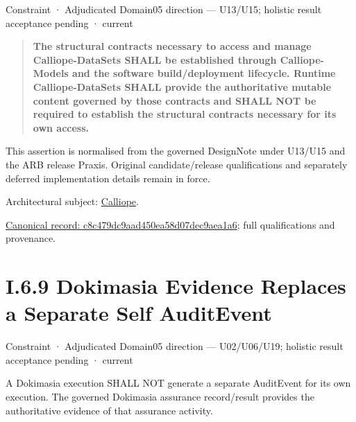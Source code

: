 \label{element:c8c479dc9aad450ea58d07dec9aea1a6}
{\small Constraint · Adjudicated Domain05 direction — U13/U15; holistic result acceptance pending · current}\par

\begin{quote}


\textbf{The structural contracts necessary to access and manage
Calliope-DataSets SHALL be established through Calliope-Models and the
software build/deployment lifecycle. Runtime Calliope-DataSets SHALL
provide the authoritative mutable content governed by those contracts
and SHALL NOT be required to establish the structural contracts
necessary for its own access.}



\end{quote}


This assertion is normalised from the governed DesignNote under U13/U15 and the ARB release Praxis. Original candidate/release qualifications and separately deferred implementation details remain in force.



Architectural subject: \hyperref[element:466ad8f75a954c0581b5bba090443849]{Calliope}.


{\footnotesize \href{../../../../continuum/motivation/constraint/c8c479dc9aad450ea58d07dec9aea1a6.md}{Canonical record: c8c479dc9aad450ea58d07dec9aea1a6}; full qualifications and provenance.}\par
\section*{I.6.9 Dokimasia Evidence Replaces a Separate Self AuditEvent}
\label{navigation:I.6.9}

\label{element:e1ce978457e543d5894de24e9be9ac2c}
{\small Constraint · Adjudicated Domain05 direction — U02/U06/U19; holistic result acceptance pending · current}\par

A Dokimasia execution SHALL NOT generate a separate AuditEvent for its own execution. The governed Dokimasia assurance record/result provides the authoritative evidence of that assurance activity.



